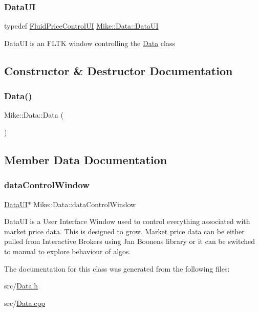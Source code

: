 \subsubsection{\texorpdfstring{Data\+UI}{DataUI}}
{\footnotesize\ttfamily typedef \hyperlink{class_fluid_price_control_u_i}{Fluid\+Price\+Control\+UI} \hyperlink{class_mike_1_1_data_a7d4ea849326ce9098b521ebc12317b58}{Mike\+::\+Data\+::\+Data\+UI}\hspace{0.3cm}{\ttfamily [private]}}

Data\+UI is an F\+L\+TK window controlling the \hyperlink{class_mike_1_1_data}{Data} class 

\subsection{Constructor \& Destructor Documentation}
\mbox{\label{class_mike_1_1_data_afb88d046472d9a49f9ea16d6773d9def}} 
\subsubsection{\texorpdfstring{Data()}{Data()}}
{\footnotesize\ttfamily Mike\+::\+Data\+::\+Data (\begin{DoxyParamCaption}{ }\end{DoxyParamCaption})}



\subsection{Member Data Documentation}
\mbox{\label{class_mike_1_1_data_a615c7c93b1c7addbe8e888ddbed837a4}} 
\subsubsection{\texorpdfstring{data\+Control\+Window}{dataControlWindow}}
{\footnotesize\ttfamily \hyperlink{class_mike_1_1_data_a7d4ea849326ce9098b521ebc12317b58}{Data\+UI}$\ast$ Mike\+::\+Data\+::data\+Control\+Window\hspace{0.3cm}{\ttfamily [private]}}

Data\+UI is a User Interface Window used to control everything associated with market price data. This is designed to grow. Market price data can be either pulled from Interactive Brokers using Jan Boonen\textquotesingle{}s library or it can be switched to \textquotesingle{}manual\textquotesingle{} to explore behaviour of algos. 

The documentation for this class was generated from the following files\+:\begin{DoxyCompactItemize}
\item 
src/\hyperlink{_data_8h}{Data.\+h}\item 
src/\hyperlink{_data_8cpp}{Data.\+cpp}\end{DoxyCompactItemize}
